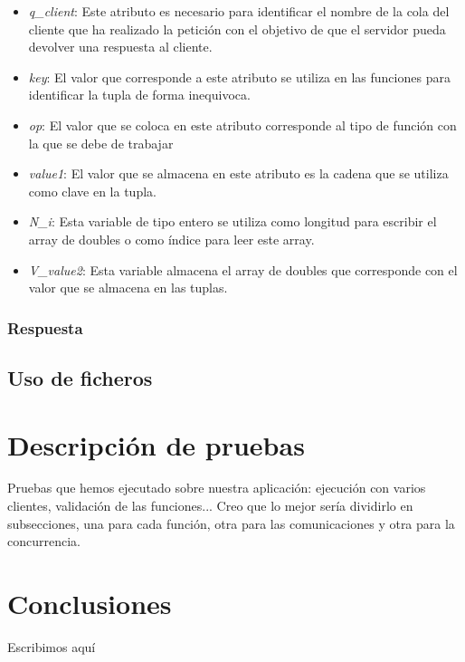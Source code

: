\documentclass[]{article}
\begin{document}
\begin{itemize}
  \item  \textit{q\_client}: Este atributo es necesario para identificar el nombre de la cola del cliente que ha realizado la petición con el objetivo de que el servidor pueda devolver una respuesta al cliente.
  \item  \textit{key}: El valor que corresponde a este atributo se utiliza en las funciones para identificar la tupla de forma inequivoca.
  \item \textit{op}: El valor que se coloca en este atributo corresponde al tipo de función con la que se debe de trabajar
  \item \textit{value1}: El valor que se almacena en este atributo es la cadena que se utiliza como clave en la tupla.
  \item \textit{N\_i}: Esta variable de tipo entero se utiliza como longitud para escribir el array de doubles o como índice para leer este array.
 \item \textit{V\_value2}: Esta variable almacena el array de doubles que corresponde con el valor que se almacena en las tuplas.
\end{itemize}

\subsubsection*{Respuesta}
\label{subsec::respuesta}




\subsection{Uso de ficheros}
\label{subsec:uso_de_ficheros}



\section{Descripción de pruebas}
\label{sec:descripcion_de_pruebas}
Pruebas que hemos ejecutado sobre nuestra aplicación: ejecución con varios clientes, validación de las funciones... Creo que lo mejor sería dividirlo en subsecciones, una para cada función, otra para las comunicaciones y otra para la concurrencia. 



\section{Conclusiones}
\label{sec:conclusiones}
Escribimos aquí
\end{document}
